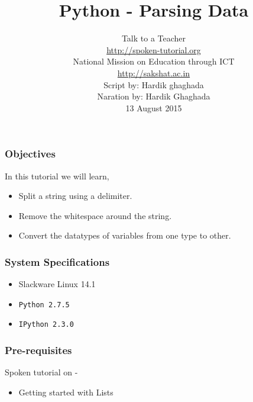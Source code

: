 \documentclass[17pt,compress]{beamer}
\author[FOSSEE]{}
\institute[IIT Bombay]{}
\date[]{}
\begin{document}
\sffamily \bfseries
\title
[Parsing Data]
{Python - Parsing Data}
\author
[FOSSEE, IIT - Bombay]
{\small Talk to a Teacher\\{\color{blue}\url{http://spoken-tutorial.org}}\\National Mission on Education
 through ICT\\{\color{blue}\url{http://sakshat.ac.in}} \\[0.5cm]{\tiny Script by: Hardik ghaghada \\ Naration by: Hardik Ghaghada \\ 13 August 2015}}

\begin{frame}
   \titlepage
\end{frame}
\begin{frame}
\frametitle{Objectives}
\label{sec-2}

  In this tutorial we will learn, \pause


\begin{itemize}
\item Split a string using a delimiter.\pause
\item Remove the whitespace around the string.\pause
\item Convert the datatypes of variables from one type to other.
\end{itemize}
\end{frame}
\begin{frame}
\frametitle{System Specifications}\pause
\begin{itemize}
\item Slackware Linux 14.1\pause
\item \texttt{Python 2.7.5} \pause
\item \texttt{IPython 2.3.0}
\end{itemize}
\end{frame}
\begin{frame}
\frametitle{Pre-requisites}
\label{sec-3}

  Spoken tutorial on -

\begin{itemize}
\item Getting started with Lists
\end{itemize}
\end{frame}
\end{document}
